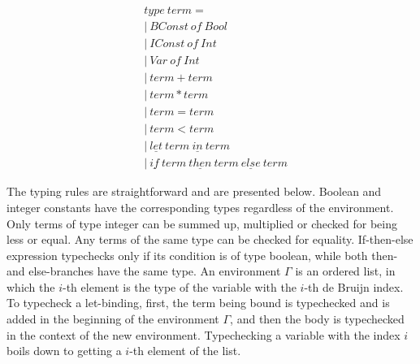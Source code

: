 \begin{align*}
  &type \ term = \\
  &| \ BConst \ of \ Bool \\
  &| \ IConst \ of \ Int \\
  &| \ Var \ of \ Int \\
  &| \ term + term \\
  &| \ term * term \\
  &| \ term = term \\
  &| \ term < term \\
  &| \ \underline{let} \ term \ \underline{in} \ term \\
  &| \ \underline{if} \ term \ \underline{then} \ term \ \underline{else} \ term
\end{align*}


The typing rules are straightforward and are presented below.
Boolean and integer constants have the corresponding types regardless of the environment.
Only terms of type integer can be summed up, multiplied or checked for being less or equal.
Any terms of the same type can be checked for equality.
If-then-else expression typechecks only if its condition is of type boolean, while both then- and else-branches have the same type.
An environment $\Gamma$ is an ordered list, in which the $i$-th element is the type of the variable with the $i$-th de Bruijn index.
To typecheck a let-binding, first, the term being bound is typechecked and is added in the beginning of the environment $\Gamma$, and then the body is typechecked in the context of the new environment.
Typechecking a variable with the index $i$ boils down to getting a $i$-th element of the list.

